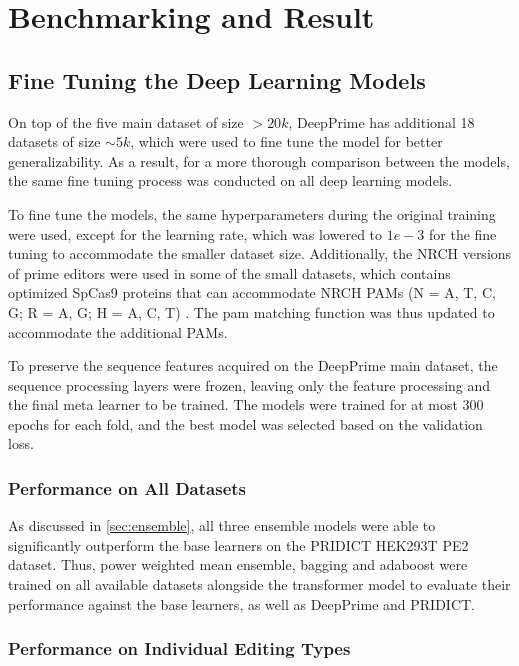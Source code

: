 \chapter{Benchmarking and Result}

\section{Fine Tuning the Deep Learning Models}

On top of the five main dataset of size $> 20k$, DeepPrime has additional 18 datasets of size $\sim5k$, which were used to fine tune the model for better generalizability. As a result, for a more thorough comparison between the models, the same fine tuning process was conducted on all deep learning models.

To fine tune the models, the same hyperparameters during the original training were used, except for the learning rate, which was lowered to $1e-3$ for the fine tuning to accommodate the smaller dataset size. Additionally, the NRCH versions of prime editors were used in some of the small datasets, which contains optimized SpCas9 proteins that can accommodate NRCH PAMs (N = A, T, C, G; R = A, G; H = A, C, T) \cite{millerContinuousEvolutionSpCas92020}. The pam matching function was thus updated to accommodate the additional PAMs.

To preserve the sequence features acquired on the DeepPrime main dataset, the sequence processing layers were frozen, leaving only the feature processing and the final meta learner to be trained. The models were trained for at most 300 epochs for each fold, and the best model was selected based on the validation loss.


\subsection{Performance on All Datasets}

As discussed in \autoref{sec:ensemble}, all three ensemble models were able to significantly outperform the base learners on the PRIDICT HEK293T PE2 dataset. Thus, power weighted mean ensemble, bagging and adaboost were trained on all available datasets alongside the transformer model to evaluate their performance against the base learners, as well as DeepPrime and PRIDICT.

\subsection{Performance on Individual Editing Types}

